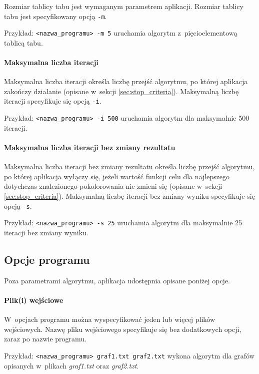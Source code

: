Rozmiar tablicy tabu jest wymaganym parametrem aplikacji. Rozmiar tablicy tabu jest specyfikowany opcją \verb+-m+. 

Przykład: \verb+<nazwa_programu> -m 5+ uruchamia algorytm z~pięcioelementową tablicą tabu.

\paragraph{Maksymalna liczba iteracji}

Maksymalna liczba iteracji określa liczbę przejść algorytmu, po której aplikacja zakończy działanie (opisane w~sekcji \ref{sec:stop_criteria}). Maksymalną liczbę iteracji specyfikuje się opcją \verb+-i+.

Przykład: \verb+<nazwa_programu> -i 500+ uruchamia algorytm dla maksymalnie 500 iteracji.

\paragraph{Maksymalna liczba iteracji bez zmiany rezultatu}

Maksymalna liczba iteracji bez zmiany rezultatu określa liczbę przejść algorytmu, po której aplikacja wyłączy się, jeżeli wartość funkcji celu dla najlepszego dotychczas znalezionego pokolorowania nie zmieni się (opisane w~sekcji \ref{sec:stop_criteria}). Maksymalną liczbę iteracji bez zmiany wyniku specyfikuje się opcją \verb+-s+.

Przykład: \verb+<nazwa_programu> -s 25+ uruchamia algorytm dla maksymalnie 25 iteracji bez zmiany wyniku.

\subsection{Opcje programu}
\label{sec:options}

Poza parametrami algorytmu, aplikacja udostępnia opisane poniżej opcje.

\paragraph{Plik(i) wejściowe}

W~opcjach programu można wyspecyfikować jeden lub więcej plików wejściowych. Nazwę pliku wejściowego specyfikuje się bez dodatkowych opcji, zaraz po nazwie programu.

Przykład: \verb+<nazwa_programu> graf1.txt graf2.txt+ wykona algorytm dla grafów opisanych w~plikach \emph{graf1.txt} oraz \emph{graf2.txt}.

